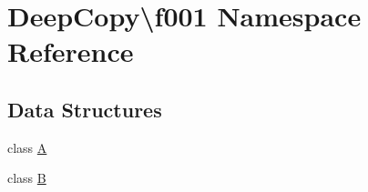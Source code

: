 \hypertarget{namespace_deep_copy_1_1f001}{}\section{Deep\+Copy\textbackslash{}f001 Namespace Reference}
\label{namespace_deep_copy_1_1f001}
\subsection*{Data Structures}
\begin{DoxyCompactItemize}
\item 
class \mbox{\hyperlink{class_deep_copy_1_1f001_1_1_a}{A}}
\item 
class \mbox{\hyperlink{class_deep_copy_1_1f001_1_1_b}{B}}
\end{DoxyCompactItemize}
